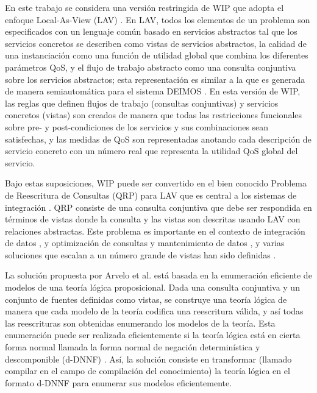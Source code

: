 En este trabajo se considera una versión restringida de WIP que adopta el
enfoque Local-As-View (LAV) \cite{levy:bucket}. En LAV, todos los elementos de un
problema son especificados con un lenguaje común basado en servicios abstractos
tal que los servicios concretos se describen como vistas de servicios
abstractos, la calidad de una instanciación como una función de utilidad global
que combina los diferentes parámetros QoS, y el flujo de trabajo abstracto como
una consulta conjuntiva sobre los servicios abstractos; esta representación es
similar a la que es generada de manera semiautomática para el sistema DEIMOS
\cite{AmbiteISWC09}. En esta versión de WIP, las reglas que definen flujos de trabajo
(consultas conjuntivas) y servicios concretos (vistas) son creados de manera que
todas las restricciones funcionales sobre pre- y post-condiciones de los
servicios y sus combinaciones sean satisfechas, y las medidas de QoS son
representadas anotando cada descripción de servicio concreto con un número real
que representa la utilidad QoS global del servicio.

Bajo estas suposiciones, WIP puede ser convertido en el bien conocido Problema
de Reescritura de Consultas (QRP) para LAV que es central a los sistemas de
integración \cite{halevy:survey}. QRP consiste de una consulta conjuntiva que debe ser
respondida en términos de vistas donde la consulta y las vistas son descritas
usando LAV con relaciones abstractas. Este problema es importante en el contexto
de integración de datos \cite{Chen05,JaudoinPRST05}, y optimización de consultas y mantenimiento
de datos \cite{AfratiLU07,levy:bucket}, y varias soluciones que escalan a un número grande de
vistas han sido definidas \cite{arvelo:aaai06,pods:DuschkaG97,sac:DuschkaG97,levy:bucket,pottinger:minicon}.

La solución propuesta por Arvelo et al. \cite{arvelo:aaai06} está basada en la enumeración
eficiente de modelos de una teoría lógica proposicional. Dada una consulta conjuntiva
y un conjunto de fuentes definidas como vistas, se construye una teoría
lógica de manera que cada modelo de la teoría codifica una
reescritura válida, y así todas las reescrituras son obtenidas enumerando los
modelos de la teoría. Esta enumeración puede ser realizada eficientemente si la
teoría lógica está en cierta forma normal llamada la forma normal de negación
determinística y descomponible (d-DNNF) \cite{darwiche:d-dnnfs}. Así,
la solución consiste en transformar (llamado compilar en el campo de
compilación del conocimiento) la teoría lógica en el formato d-DNNF para
enumerar sus modelos eficientemente.


